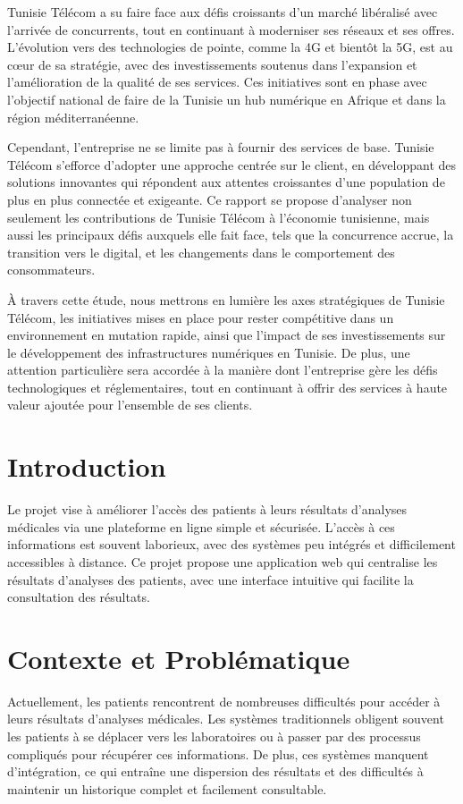\documentclass[12pt,a4paper]{report}
\begin{document}
Tunisie Télécom a su faire face aux défis croissants d’un marché libéralisé avec l’arrivée de concurrents, tout en continuant à moderniser ses réseaux et ses offres. L’évolution vers des technologies de pointe, comme la 4G et bientôt la 5G, est au cœur de sa stratégie, avec des investissements soutenus dans l’expansion et l’amélioration de la qualité de ses services. Ces initiatives sont en phase avec l’objectif national de faire de la Tunisie un hub numérique en Afrique et dans la région méditerranéenne.

Cependant, l’entreprise ne se limite pas à fournir des services de base. Tunisie Télécom s’efforce d’adopter une approche centrée sur le client, en développant des solutions innovantes qui répondent aux attentes croissantes d’une population de plus en plus connectée et exigeante. Ce rapport se propose d’analyser non seulement les contributions de Tunisie Télécom à l’économie tunisienne, mais aussi les principaux défis auxquels elle fait face, tels que la concurrence accrue, la transition vers le digital, et les changements dans le comportement des consommateurs.

À travers cette étude, nous mettrons en lumière les axes stratégiques de Tunisie Télécom, les initiatives mises en place pour rester compétitive dans un environnement en mutation rapide, ainsi que l'impact de ses investissements sur le développement des infrastructures numériques en Tunisie. De plus, une attention particulière sera accordée à la manière dont l’entreprise gère les défis technologiques et réglementaires, tout en continuant à offrir des services à haute valeur ajoutée pour l'ensemble de ses clients.


\newpage
\section{Introduction}
Le projet vise à améliorer l'accès des patients à leurs résultats d'analyses médicales via une plateforme en ligne simple et sécurisée. L'accès à ces informations est souvent laborieux, avec des systèmes peu intégrés et difficilement accessibles à distance. Ce projet propose une application web qui centralise les résultats d'analyses des patients, avec une interface intuitive qui facilite la consultation des résultats.

\section{Contexte et Problématique}
Actuellement, les patients rencontrent de nombreuses difficultés pour accéder à leurs résultats d'analyses médicales. Les systèmes traditionnels obligent souvent les patients à se déplacer vers les laboratoires ou à passer par des processus compliqués pour récupérer ces informations. De plus, ces systèmes manquent d'intégration, ce qui entraîne une dispersion des résultats et des difficultés à maintenir un historique complet et facilement consultable.
\end{document}
